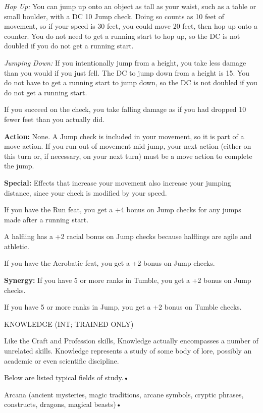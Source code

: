 \documentclass{article}
\begin{document}
\vspace{12pt}
\textit{Hop Up: }You can jump up onto an object as tall as your waist, such as 
a table or small boulder, with a DC 10 Jump check. Doing so counts as 10 feet of 
movement, so if your speed is 30 feet, you could move 20 feet, then hop up onto 
a counter. You do not need to get a running start to hop up, so the DC is not doubled 
if you do not get a running start.

\textit{Jumping Down: }If you intentionally jump from a height, you take less damage 
than you would if you just fell. The DC to jump down from a height is 15. You do 
not have to get a running start to jump down, so the DC is not doubled if you do 
not get a running start.

If you succeed on the check, you take falling damage as if you had dropped 10 fewer 
feet than you actually did.

\textbf{Action:} None. A Jump check is included in your movement, so it is part 
of a move action. If you run out of movement mid-jump, your next action (either 
on this turn or, if necessary, on your next turn) must be a move action to complete 
the jump.

\textbf{Special:} Effects that increase your movement also increase your jumping 
distance, since your check is modified by your speed.

If you have the Run feat, you get a +4 bonus on Jump checks for any jumps made 
after a running start.

A halfling has a +2 racial bonus on Jump checks because halflings are agile and 
athletic.

If you have the Acrobatic feat, you get a +2 bonus on Jump checks.

\textbf{Synergy:} If you have 5 or more ranks in Tumble, you get a +2 bonus on 
Jump checks.

If you have 5 or more ranks in Jump, you get a +2 bonus on Tumble checks.

\vspace{12pt}
KNOWLEDGE (INT; TRAINED ONLY)

Like the Craft and Profession skills, Knowledge actually encompasses a number of 
unrelated skills. Knowledge represents a study of some body of lore, possibly an 
academic or even scientific discipline.

Below are listed typical fields of study.• 

\parindent=3pt
Arcana (ancient mysteries, magic traditions, arcane symbols, cryptic phrases, constructs, 
dragons, magical beasts)• 
\end{document}
